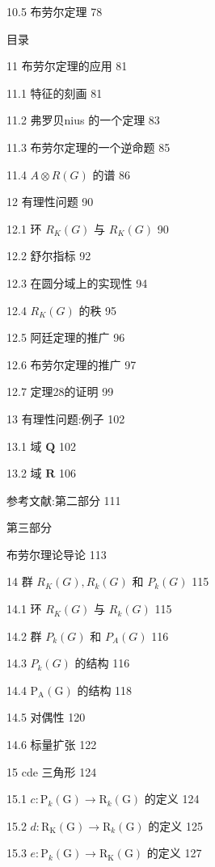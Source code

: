 \documentclass[10pt]{article}
\begin{document}
10.5 布劳尔定理 78

目录

11 布劳尔定理的应用 81

11.1 特征的刻画 81

11.2 弗罗贝nius 的一个定理 83

11.3 布劳尔定理的一个逆命题 85

11.4 \(A \otimes  R\left( G\right)\) 的谱 86

12 有理性问题 90

12.1 环 \({R}_{K}\left( G\right)\) 与 \({R}_{K}\left( G\right)\) 90

12.2 舒尔指标 92

12.3 在圆分域上的实现性 94

12.4 \({R}_{K}\left( G\right)\) 的秩 95

12.5 阿廷定理的推广 96

12.6 布劳尔定理的推广 97

12.7 定理28的证明 99

13 有理性问题:例子 102

13.1 域 \(\mathbf{Q}\) 102

13.2 域 \(\mathbf{R}\) 106

参考文献:第二部分 111

第三部分

布劳尔理论导论 113

14 群 \({R}_{K}\left( G\right) ,{R}_{k}\left( G\right)\) 和 \({P}_{k}\left( G\right)\) 115

14.1 环 \({R}_{K}\left( G\right)\) 与 \({R}_{k}\left( G\right)\) 115

14.2 群 \({P}_{k}\left( G\right)\) 和 \({P}_{A}\left( G\right)\) 116

14.3 \({P}_{k}\left( G\right)\) 的结构 116

14.4 \({\mathrm{P}}_{\mathrm{A}}\left( \mathrm{G}\right)\) 的结构 118

14.5 对偶性 120

14.6 标量扩张 122

15 cde 三角形 124

15.1 \(c : {\mathrm{P}}_{k}\left( \mathrm{G}\right)  \rightarrow  {\mathrm{R}}_{k}\left( \mathrm{G}\right)\) 的定义 124

15.2 \(d : {\mathrm{R}}_{\mathrm{K}}\left( \mathrm{G}\right)  \rightarrow  {\mathrm{R}}_{k}\left( \mathrm{G}\right)\) 的定义 125

15.3 \(e : {\mathrm{P}}_{k}\left( \mathrm{G}\right)  \rightarrow  {\mathrm{R}}_{\mathrm{K}}\left( \mathrm{G}\right)\) 的定义 127
\end{document}
